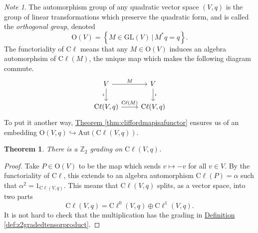 \documentclass[a4paper]{report}
\newcommand{\Z}{\mathbb{Z}}
\newcommand{\cliff}{\mathrm{C}\ell}
\newcommand{\Or}{\mathrm{O}}
\newcommand{\GL}{\mathrm{GL}}
\theoremstyle{definition}
\theoremstyle{plain}
\newtheorem{theorem}{Theorem}[section]
\theoremstyle{remark}
\newtheorem{note}{Note}[section]
\begin{document}
\begin{note}
  The automorphism group of any quadratic vector space $(V,q)$ is the group of linear transformations which preserve the quadratic form, and is called the \emph{orthogonal group}, denoted 
  \begin{equation*}
    \Or(V) = \left\{ M \in \GL(V)\,\big|\, M^{*}q = q \right\}.
  \end{equation*}
  The functoriality of $\cliff$ means that any $M \in \Or(V)$ induces an algebra automorphsim of $\cliff(M)$, the unique map which makes the following diagram commute.
  \begin{equation*}
    \begin{tikzcd}
      V \arrow[d, swap, "\iota"] \arrow[r, "M"] & V \arrow[d, "\iota"] \\
      \cliff(V, q) \arrow[r, "\cliff(M)"] & \cliff(V, q)
    \end{tikzcd}
  \end{equation*}
  To put it another way, \hyperref[thm:cliffordmapisafunctor]{Theorem \ref*{thm:cliffordmapisafunctor}} ensures us of an embedding $\Or(V,q) \hookrightarrow \mathrm{Aut}(\cliff(V,q))$.
\end{note}

\begin{theorem}
  There is a $\Z_{2}$ grading on $\cliff(V,q)$.
\end{theorem}
\begin{proof}
  Take $P \in \Or(V)$ to be the map which sends $v \mapsto -v$ for all $v \in V$. By the functoriality of $\cliff$, this extends to an algebra automorphism $\cliff(P) = \alpha$ such that $\alpha^{2} = 1_{\cliff(V,q)}$. This means that $\cliff(V,q)$ splits, as a vector space, into two parts
  \begin{equation*}
    \cliff(V,q) = \cliff^{0}(V,q) \oplus \cliff^{1}(V,q).
  \end{equation*}
  It is not hard to check that the multiplication has the grading in \hyperref[def:z2gradedtensorproduct]{Definition \ref*{def:z2gradedtensorproduct}}.
\end{proof}
\end{document}
